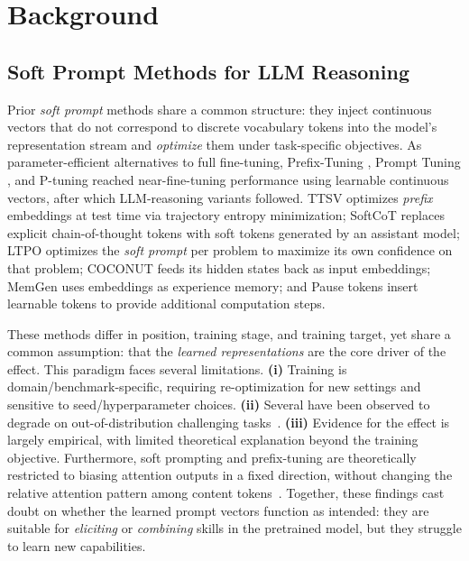 
\section{Background}\label{sec:background}

\subsection{Soft Prompt Methods for LLM Reasoning}\label{sec:rw_soft_prompt}

Prior \textit{soft prompt} methods share a common structure: they inject continuous vectors that do not correspond to discrete vocabulary tokens into the model's representation stream and \emph{optimize} them under task-specific objectives. As parameter-efficient alternatives to full fine-tuning, Prefix-Tuning \citep{li2021prefix}, Prompt Tuning \citep{lester2021power}, and P-tuning \citep{liu2021gpt} reached near-fine-tuning performance using learnable continuous vectors, after which LLM-reasoning variants followed. TTSV \citep{kang2025model} optimizes \emph{prefix} embeddings at test time via trajectory entropy minimization; SoftCoT \citep{xu2025softcot} replaces explicit chain-of-thought tokens with soft tokens generated by an assistant model; LTPO \citep{ye2025thinking} optimizes the \textit{soft prompt} per problem to maximize its own confidence on that problem; COCONUT \citep{hao2024training} feeds its hidden states back as input embeddings; MemGen \citep{zhang2025memgen} uses embeddings as experience memory; and Pause tokens \citep{goyal2024think} insert learnable tokens to provide additional computation steps.

These methods differ in position, training stage, and training target, yet share a common assumption: that the \emph{learned representations} are the core driver of the effect. This paradigm faces several limitations. \textbf{(i)} Training is domain/benchmark-specific, requiring re-optimization for new settings and sensitive to seed/hyperparameter choices. \textbf{(ii)} Several have been observed to degrade on out-of-distribution challenging tasks~\citep{ye2025thinking}. \textbf{(iii)} Evidence for the effect is largely empirical, with limited theoretical explanation beyond the training objective. Furthermore, soft prompting and prefix-tuning are theoretically restricted to biasing attention outputs in a fixed direction, without changing the relative attention pattern among content tokens~\citep{petrov2024prefix}. Together, these findings cast doubt on whether the learned prompt vectors function as intended: they are suitable for \emph{eliciting} or \emph{combining} skills in the pretrained model, but they struggle to learn new capabilities.

